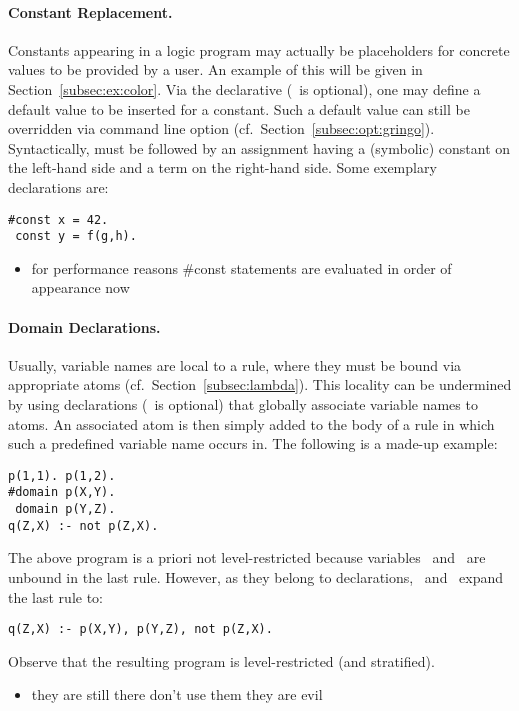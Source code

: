 \paragraph{Constant Replacement.}
Constants appearing in a logic program may actually be placeholders for
concrete values to be provided by a user.
An example of this will be given in Section~\ref{subsec:ex:color}.
Via the  declarative (\code{\#}~is optional),
one may define a default value to be inserted for a constant.
Such a default value can still be overridden via command line option
 (cf.\ Section~\ref{subsec:opt:gringo}).
Syntactically,  must be followed by an assignment having
a (symbolic) constant on the left-hand side and a term on the right-hand side.
Some exemplary  declarations are:
%
\begin{lstlisting}[numbers=none]
#const x = 42.
 const y = f(g,h).
\end{lstlisting}

\begin{newstuff}
	\begin{itemize}
		\item for performance reasons \#const statements are evaluated in order of appearance now
	\end{itemize}
\end{newstuff}

\paragraph{Domain Declarations.}
Usually, variable names are local to a rule,
where they must be bound via appropriate atoms (cf.\ Section~\ref{subsec:lambda}).
This locality can be undermined by using
 declarations (\code{\#}~is optional)
that globally associate variable names to atoms.
An associated atom is then simply added to the body of a rule in which
such a predefined variable name occurs in.
The following is a made-up example:
%
\begin{lstlisting}[numbers=none]
p(1,1). p(1,2).
#domain p(X,Y).
 domain p(Y,Z).
q(Z,X) :- not p(Z,X).
\end{lstlisting}
%
The above program is a priori not level-restricted because
variables~ and~ are unbound in the last rule.
However, as they belong to  declarations,
\gringo\ and \clingo\ expand the last rule to:
%
\begin{lstlisting}[numbers=none]
q(Z,X) :- p(X,Y), p(Y,Z), not p(Z,X).
\end{lstlisting}
%
Observe that the resulting program is level-restricted (and stratified).
\begin{newstuff}
	\begin{itemize}
		\item they are still there don't use them they are evil
	\end{itemize}
\end{newstuff}

